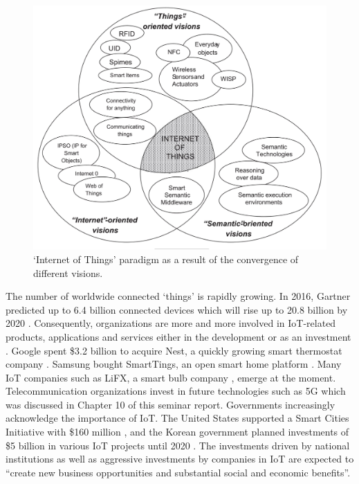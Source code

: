 	\begin{figure}[ht]
	    \begin{center}
	    \includegraphics[scale=0.35]{Talk11/iot_visions.jpg}
	    \end{center}
	    \caption{`Internet of Things' paradigm as a result of the convergence of different visions. }
	    \label{fig:iot_visions}
    \end{figure}

	The number of worldwide connected `things' is rapidly growing. In 2016, Gartner predicted up to 6.4 billion connected devices which will rise up to 20.8 billion by 2020 \cite{gartner}. Consequently, organizations are more and more involved in IoT-related products, applications and services either in the development or as an investment \cite{ju}. Google spent \$3.2 billion to acquire Nest, a quickly growing smart thermostat company \cite{tilley_nest}. Samsung bought SmartTings, an open smart home platform \cite{tilley_smart}. Many IoT companies such as LiFX, a smart bulb company  \cite{lifx}, emerge at the moment. Telecommunication organizations invest in future technologies such as 5G which was discussed in Chapter 10 of this seminar report. Governments increasingly acknowledge the importance of IoT. The United States supported a Smart Cities Initiative with \$160 million \cite{miller}, and the Korean government planned investments of \$5 billion in various IoT projects until 2020 \cite{cho}. The investments driven by national institutions as well as aggressive investments by companies in IoT are expected to ``create new business opportunities and substantial social and economic benefits''\cite{ju}. 

